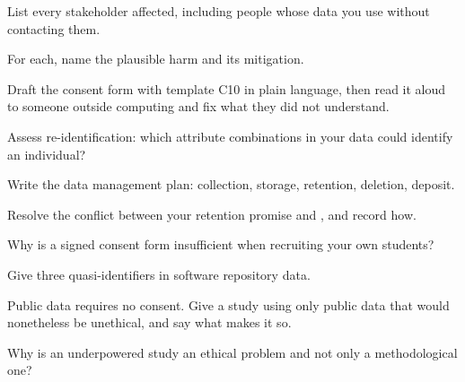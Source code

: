 \begin{lab}
\begin{tightnum}
  \item List every stakeholder affected, including people whose data you use
    without contacting them.
  \item For each, name the plausible harm and its mitigation.
  \item Draft the consent form with template C10 in plain language, then read
    it aloud to someone outside computing and fix what they did not understand.
  \item Assess re-identification: which attribute combinations in your data
    could identify an individual?
  \item Write the data management plan: collection, storage, retention,
    deletion, deposit.
  \item Resolve the conflict between your retention promise and
    , and record how.
\end{tightnum}
\end{lab}

\begin{checkpoint}
\begin{tightnum}
  \item Why is a signed consent form insufficient when recruiting your own
    students?
  \item Give three quasi-identifiers in software repository data.
  \item Public data requires no consent. Give a study using only public data
    that would nonetheless be unethical, and say what makes it so.
  \item Why is an underpowered study an ethical problem and not only a
    methodological one?
\end{tightnum}
\end{checkpoint}

